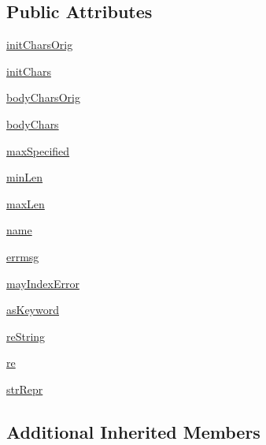 \subsection*{Public Attributes}
\begin{DoxyCompactItemize}
\item 
\hyperlink{classsetuptools_1_1__vendor_1_1pyparsing_1_1Word_a9681daf4789d3d36887e9ef427b9e50b}{init\+Chars\+Orig}
\item 
\hyperlink{classsetuptools_1_1__vendor_1_1pyparsing_1_1Word_ae0c71c67628c7f4b9826426181fb109f}{init\+Chars}
\item 
\hyperlink{classsetuptools_1_1__vendor_1_1pyparsing_1_1Word_af16ac8369372095b10aea9dce00dc16f}{body\+Chars\+Orig}
\item 
\hyperlink{classsetuptools_1_1__vendor_1_1pyparsing_1_1Word_ad83553d2b5b0c2902fb43048d93ef8fa}{body\+Chars}
\item 
\hyperlink{classsetuptools_1_1__vendor_1_1pyparsing_1_1Word_a7d9701bf74f051162ef3cbda285c0785}{max\+Specified}
\item 
\hyperlink{classsetuptools_1_1__vendor_1_1pyparsing_1_1Word_a1ddd6c8881e41240be03fb2abe9173f2}{min\+Len}
\item 
\hyperlink{classsetuptools_1_1__vendor_1_1pyparsing_1_1Word_aee5de6b4d8bef6bfcf84c793c626f1d6}{max\+Len}
\item 
\hyperlink{classsetuptools_1_1__vendor_1_1pyparsing_1_1Word_a9f1634d94872dbd6235f63760f743993}{name}
\item 
\hyperlink{classsetuptools_1_1__vendor_1_1pyparsing_1_1Word_af0adff2d657d301fa727583b7e126a7b}{errmsg}
\item 
\hyperlink{classsetuptools_1_1__vendor_1_1pyparsing_1_1Word_a6594dee81b74cae16fd94bc81e0dc1d5}{may\+Index\+Error}
\item 
\hyperlink{classsetuptools_1_1__vendor_1_1pyparsing_1_1Word_ace9c177ced3a1a96c0da37052f558dc5}{as\+Keyword}
\item 
\hyperlink{classsetuptools_1_1__vendor_1_1pyparsing_1_1Word_a6571e56d895cf39cbaa04ddc3faa6be2}{re\+String}
\item 
\hyperlink{classsetuptools_1_1__vendor_1_1pyparsing_1_1Word_a2d1cb697fff2c4f80d9413ffa47283f5}{re}
\item 
\hyperlink{classsetuptools_1_1__vendor_1_1pyparsing_1_1Word_ade93cc7b82dea811353fada4335f3744}{str\+Repr}
\end{DoxyCompactItemize}
\subsection*{Additional Inherited Members}


